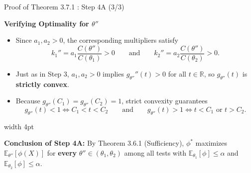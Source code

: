 \documentclass[10pt, aspectratio=169, xcolor=dvipsnames]{beamer}
\newcommand{\lead}[1]{{\color{UniBlue}\bfseries #1}}
\begin{document}
\begin{frame}{Proof of Theorem 3.7.1 : Step 4A (3/3)}
    
    \lead{Verifying Optimality for $\theta''$}\\
    \vspace{0.2cm}
    
    \color{Slate}
    \begin{itemize}
        \setlength\itemsep{6pt}
        \item[\textcolor{Teal}{\textbullet}] Since $a_1, a_2 > 0$, the corresponding multipliers satisfy
        \[
            k_1'' = a_1 \frac{C(\theta'')}{C(\theta_1)} > 0
            \qquad \text{and} \qquad
            k_2'' = a_2 \frac{C(\theta'')}{C(\theta_2)} > 0.
        \]
        
        \item[\textcolor{Teal}{\textbullet}] Just as in Step 3, $a_1, a_2 > 0$ implies $g_{\theta''}''(t) > 0$ for all $t \in \mathbb{R}$, so $g_{\theta''}(t)$ is \textbf{strictly convex}.
        
        \item[\textcolor{Teal}{\textbullet}] Because $g_{\theta''}(C_1) = g_{\theta''}(C_2) = 1$, strict convexity guarantees
        \[
            g_{\theta''}(t) < 1 \iff C_1 < t < C_2
            \qquad \text{and} \qquad
            g_{\theta''}(t) > 1 \iff t < C_1 \text{ or } t > C_2.
        \]
    \end{itemize}
    
    \vspace{0.15cm}
    \noindent
    {\color{Teal}\vrule width 4pt}%
    \hspace{10pt}%
    \begin{minipage}{\dimexpr\textwidth-14pt\relax}
        \textbf{Conclusion of Step 4A:} By Theorem 3.6.1 (Sufficiency), $\phi^*$ maximizes $\mathbb{E}_{\theta''}[\phi(X)]$ for \textbf{every} $\theta'' \in (\theta_1, \theta_2)$ among all tests with $\mathbb{E}_{\theta_1}[\phi] \le \alpha$ and $\mathbb{E}_{\theta_2}[\phi] \le \alpha$.
    \end{minipage}
\end{frame}
\end{document}

